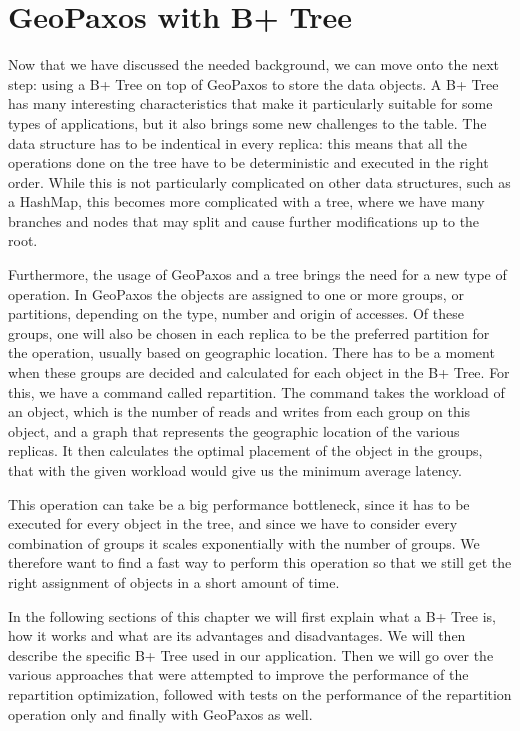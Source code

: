 \chapter{GeoPaxos with B+ Tree}\label{sec:geopaxos-with-b+tree}
Now that we have discussed the needed background, we can move onto the next step: using a B+ Tree on top of GeoPaxos to store the data objects. A B+ Tree has many interesting characteristics that make it particularly suitable for some types of applications, but it also brings some new challenges to the table. The data structure has to be indentical in every replica: this means that all the operations done on the tree have to be deterministic and executed in the right order. While this is not particularly complicated on other data structures, such as a HashMap, this becomes more complicated with a tree, where we have many branches and nodes that may split and cause further modifications up to the root.

Furthermore, the usage of GeoPaxos and a tree brings the need for a new type of operation. In GeoPaxos the objects are assigned to one or more groups, or partitions, depending on the type, number and origin of accesses. Of these groups, one will also be chosen in each replica to be the preferred partition for the operation, usually based on geographic location. There has to be a moment when these groups are decided and calculated for each object in the B+ Tree. For this, we have a command called repartition. The command takes the workload of an object, which is the number of reads and writes from each group on this object, and a graph that represents the geographic location of the various replicas. It then calculates the optimal placement of the object in the groups, that with the given workload would give us the minimum average latency.

This operation can take be a big performance bottleneck, since it has to be executed for every object in the tree, and since we have to consider every combination of groups it scales exponentially with the number of groups. We therefore want to find a fast way to perform this operation so that we still get the right assignment of objects in a short amount of time.

In the following sections of this chapter we will first explain what a B+ Tree is, how it works and what are its advantages and disadvantages. We will then describe the specific B+ Tree used in our application. Then we will go over the various approaches that were attempted to improve the performance of the repartition optimization, followed with tests on the performance of the repartition operation only and finally with GeoPaxos as well.

